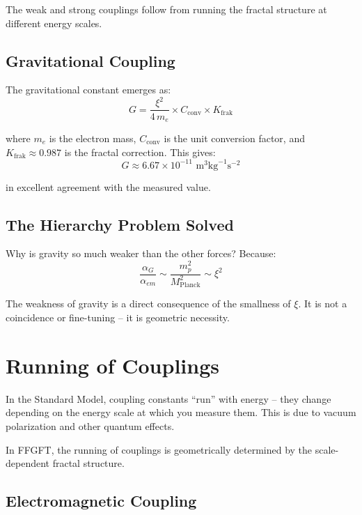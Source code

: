 The weak and strong couplings follow from running the fractal structure at different energy scales.

\subsection{Gravitational Coupling}

The gravitational constant emerges as:
\begin{equation}
G = \frac{\xi^2}{4\,m_e} \times C_{\text{conv}} \times K_{\text{frak}}
\end{equation}

where $m_e$ is the electron mass, $C_{\text{conv}}$ is the unit conversion factor, and $K_{\text{frak}} \approx 0.987$ is the fractal correction. This gives:
\begin{equation}
G \approx 6.67 \times 10^{-11} \text{ m}^3\text{kg}^{-1}\text{s}^{-2}
\end{equation}

in excellent agreement with the measured value.

\subsection{The Hierarchy Problem Solved}

Why is gravity so much weaker than the other forces? Because:
\begin{equation}
\frac{\alpha_G}{\alpha_{em}} \sim \frac{m_p^2}{M_{\text{Planck}}^2} \sim \xi^2
\end{equation}

The weakness of gravity is a direct consequence of the smallness of $\xi$. It is not a coincidence or fine-tuning -- it is geometric necessity.

\section{Running of Couplings}

In the Standard Model, coupling constants ``run'' with energy -- they change depending on the energy scale at which you measure them. This is due to vacuum polarization and other quantum effects.

In FFGFT, the running of couplings is geometrically determined by the scale-dependent fractal structure.

\subsection{Electromagnetic Coupling}


